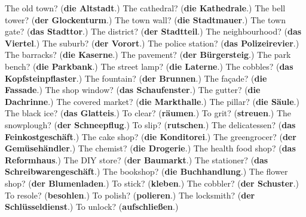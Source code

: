 \begin{tcolorbox}[breakable,colback=teal!4,colframe=teal!35!black,title={Before you move on}]
The old town? (\textbf{die Altstadt}.) The cathedral? (\textbf{die Kathedrale}.) The bell tower? (\textbf{der Glockenturm}.) The town wall? (\textbf{die Stadtmauer}.) The town gate? (\textbf{das Stadttor}.) The district? (\textbf{der Stadtteil}.) The neighbourhood? (\textbf{das Viertel}.) The suburb? (\textbf{der Vorort}.) The police station? (\textbf{das Polizeirevier}.) The barracks? (\textbf{die Kaserne}.) The pavement? (\textbf{der Bürgersteig}.) The park bench? (\textbf{die Parkbank}.) The street lamp? (\textbf{die Laterne}.) The cobbles? (\textbf{das Kopfsteinpflaster}.) The fountain? (\textbf{der Brunnen}.) The façade? (\textbf{die Fassade}.) The shop window? (\textbf{das Schaufenster}.) The gutter? (\textbf{die Dachrinne}.) The covered market? (\textbf{die Markthalle}.) The pillar? (\textbf{die Säule}.) The black ice? (\textbf{das Glatteis}.) To clear? (\textbf{räumen}.) To grit? (\textbf{streuen}.) The snowplough? (\textbf{der Schneepflug}.) To slip? (\textbf{rutschen}.) The delicatessen? (\textbf{das Feinkostgeschäft}.) The cake shop? (\textbf{die Konditorei}.) The greengrocer? (\textbf{der Gemüsehändler}.) The chemist? (\textbf{die Drogerie}.) The health food shop? (\textbf{das Reformhaus}.) The DIY store? (\textbf{der Baumarkt}.) The stationer? (\textbf{das Schreibwarengeschäft}.) The bookshop? (\textbf{die Buchhandlung}.) The flower shop? (\textbf{der Blumenladen}.) To stick? (\textbf{kleben}.) The cobbler? (\textbf{der Schuster}.) To resole? (\textbf{besohlen}.) To polish? (\textbf{polieren}.) The locksmith? (\textbf{der Schlüsseldienst}.) To unlock? (\textbf{aufschließen}.)
\end{tcolorbox}
